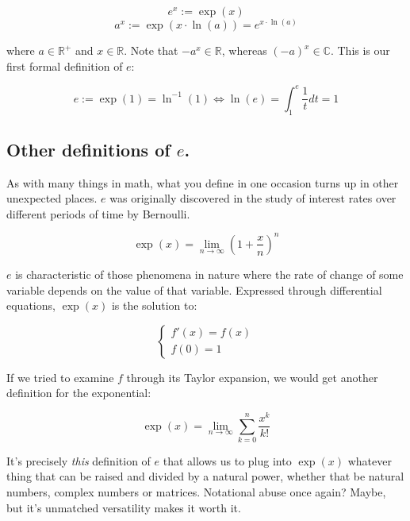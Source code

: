 $$e^x := \exp(x)$$
$$a^x := \exp(x\cdot \ln(a)) = e^{x\cdot \ln(a)}$$

where $a\in \mathbb{R}^+$ and $x\in \mathbb{R}$. Note that $-a^x \in \mathbb{R}$, whereas $(-a)^x \in \mathbb{C}$. This is our first formal definition of $e$:

$$e := \exp(1) = \ln^{-1}(1) \iff \ln(e) = \int_{1}^{e} \frac{1}{t} dt = 1$$

\subsection{Other definitions of $e$.}

As with many things in math, what you define in one occasion turns up in other unexpected places. $e$ was originally discovered in the study of interest rates over different periods of time by Bernoulli.

$$\exp(x) = \lim_{n \to \infty} \left(1 + \frac{x}{n}\right)^n$$

$e$ is characteristic of those phenomena in nature where the rate of change of some variable depends on the value of that variable. Expressed through differential equations, $\exp(x)$ is the solution to:

\begin{equation}
	\begin{cases}
		f'(x) = f(x) \\
		f(0) = 1
	\end{cases}
\end{equation}

If we tried to examine $f$ through its Taylor expansion, we would get another definition for the exponential:

$$\exp(x) = \lim_{n \to \infty} \sum\limits_{k = 0}^{n} \frac{x^k}{k!}$$

It's precisely \textit{this} definition of $e$ that allows us to plug into $\exp(x)$ whatever thing that can be raised and divided by a natural power, whether that be natural numbers, complex numbers or matrices. Notational abuse once again? Maybe, but it's unmatched versatility makes it worth it.

\newpage
